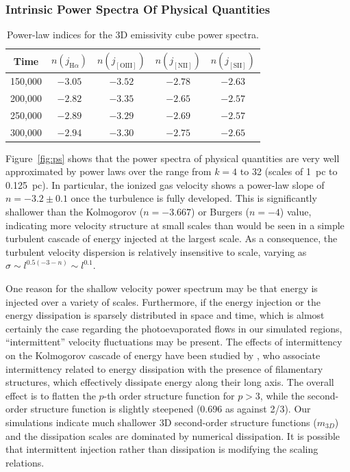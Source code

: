 \documentclass[useAMS,usenatbib]{mn2e}
\begin{document}
\subsubsection{Intrinsic Power Spectra Of Physical Quantities}
\label{sssec:ips}
\begin{table}
\caption{Power-law indices for the 3D emissivity cube power spectra.}
\label{tab:psemiss}
\begin{tabular}{ccccc}
\hline
Time&$n(j_{{\mathrm{H}}\alpha})$ & $n(j_{\mathrm{[OIII]}})$ &
  $n(j_{\mathrm{[NII]}})$ & $n(j_{\mathrm{[SII]}})$ \\
\hline
150,000  &  $-3.05$    &    $-3.52$   &     $-2.78$  &    $-2.63$ \\
200,000  &  $-2.82$    &    $-3.35$   &     $-2.65$  &    $-2.57$ \\
250,000  &  $-2.89$    &    $-3.29$   &     $-2.69$  &    $-2.57$ \\
300,000  &  $-2.94$    &    $-3.30$   &     $-2.75$  &    $-2.65$ \\ 
\hline
\end{tabular}
\end{table}
Figure~\ref{fig:ps} shows that
the power spectra of physical quantities are very well approximated
by power laws over the range from $k = 4$ to 32
(scales of 1~pc to 0.125~pc).
In particular, the ionized gas velocity shows
a power-law slope of \(n = -3.2 \pm 0.1\)
once the turbulence is fully developed. 
This is significantly shallower than the Kolmogorov (\(n = -3.667\))
or Burgers (\(n = -4\)) value,
indicating more velocity structure at small scales than would be seen
in a simple turbulent cascade of energy injected at the largest scale.
As a consequence,
the turbulent velocity dispersion is relatively insensitive to scale,
varying as \(\sigma \sim l^{0.5 (-3 - n)} \sim l^{0.1}\). 

One reason for the shallow velocity power spectrum may be that energy
is injected over a variety of scales.  Furthermore, if the energy
injection or the energy dissipation is sparsely distributed in space
and time, which is almost certainly the case regarding the
photoevaporated flows in our simulated \hii{} regions,
``intermittent'' velocity fluctuations may be present. The effects of
intermittency on the Kolmogorov cascade of energy have been studied by
\citet{1994PhRvL..72..336S}, who associate intermittency related to
energy dissipation with the presence of filamentary structures, which
effectively dissipate energy along their long axis. The overall effect
is to flatten the $p$-th order structure function for $p >3$, while
the second-order structure function is slightly steepened (0.696 as
against 2/3). Our simulations indicate much shallower 3D second-order
structure functions ($m_{3D}$) and the dissipation scales are
dominated by numerical dissipation. It is possible that intermittent
injection rather than dissipation is modifying the scaling relations.
\end{document}
